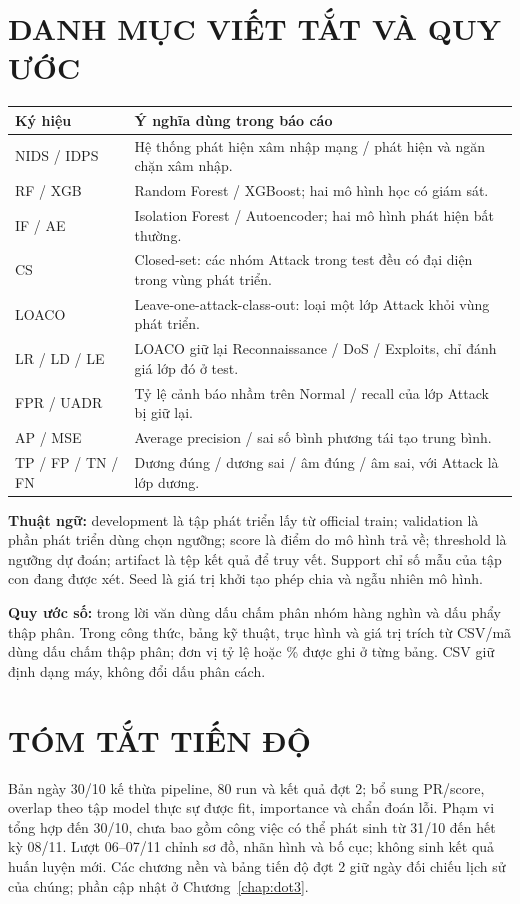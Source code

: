 \documentclass[12pt,a4paper,oneside]{report}
\begin{document}
\chapter*{DANH MỤC VIẾT TẮT VÀ QUY ƯỚC}
\begingroup\small\renewcommand{\arraystretch}{1.2}
\noindent\begin{tabularx}{\textwidth}{L{2.8cm}Y}\toprule
Ký hiệu & Ý nghĩa dùng trong báo cáo\\\midrule
NIDS / IDPS & Hệ thống phát hiện xâm nhập mạng / phát hiện và ngăn chặn xâm nhập.\\
RF / XGB & Random Forest / XGBoost; hai mô hình học có giám sát.\\
IF / AE & Isolation Forest / Autoencoder; hai mô hình phát hiện bất thường.\\
CS & Closed-set: các nhóm Attack trong test đều có đại diện trong vùng phát triển.\\
LOACO & Leave-one-attack-class-out: loại một lớp Attack khỏi vùng phát triển.\\
LR / LD / LE & LOACO giữ lại Reconnaissance / DoS / Exploits, chỉ đánh giá lớp đó ở test.\\
FPR / UADR & Tỷ lệ cảnh báo nhầm trên Normal / recall của lớp Attack bị giữ lại.\\
AP / MSE & Average precision / sai số bình phương tái tạo trung bình.\\
TP / FP / TN / FN & Dương đúng / dương sai / âm đúng / âm sai, với Attack là lớp dương.\\
\bottomrule\end{tabularx}\endgroup

\textbf{Thuật ngữ:} development là tập phát triển lấy từ official train; validation là phần phát triển dùng chọn ngưỡng; score là điểm do mô hình trả về; threshold là ngưỡng dự đoán; artifact là tệp kết quả để truy vết. Support chỉ số mẫu của tập con đang được xét. Seed là giá trị khởi tạo phép chia và ngẫu nhiên mô hình.

\textbf{Quy ước số:} trong lời văn dùng dấu chấm phân nhóm hàng nghìn và dấu phẩy thập phân. Trong công thức, bảng kỹ thuật, trục hình và giá trị trích từ CSV/mã dùng dấu chấm thập phân; đơn vị tỷ lệ hoặc \% được ghi ở từng bảng. CSV giữ định dạng máy, không đổi dấu phân cách.
\clearpage
\chapter*{TÓM TẮT TIẾN ĐỘ}
Bản ngày 30/10 kế thừa pipeline, 80 run và kết quả đợt 2; bổ sung PR/score, overlap theo tập model thực sự được fit, importance và chẩn đoán lỗi. Phạm vi tổng hợp đến 30/10, chưa bao gồm công việc có thể phát sinh từ 31/10 đến hết kỳ 08/11. Lượt 06--07/11 chỉnh sơ đồ, nhãn hình và bố cục; không sinh kết quả huấn luyện mới. Các chương nền và bảng tiến độ đợt 2 giữ ngày đối chiếu lịch sử của chúng; phần cập nhật ở Chương~\ref{chap:dot3}.
\end{document}
